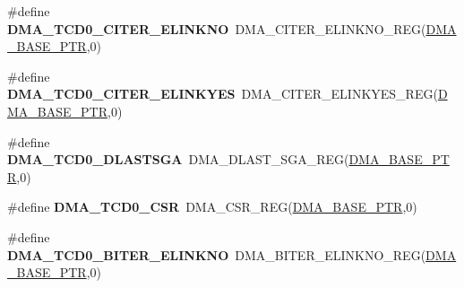 \begin{DoxyCompactItemize}
\item 
\hypertarget{group___d_m_a___register___accessor___macros_gaf189723f0b4d98fffdf6860fcb74177d}{}\#define {\bfseries D\+M\+A\+\_\+\+T\+C\+D0\+\_\+\+C\+I\+T\+E\+R\+\_\+\+E\+L\+I\+N\+K\+N\+O}~D\+M\+A\+\_\+\+C\+I\+T\+E\+R\+\_\+\+E\+L\+I\+N\+K\+N\+O\+\_\+\+R\+E\+G(\hyperlink{group___d_m_a___peripheral_ga6997fbc1b1973e9f27170217a3bd6f22}{D\+M\+A\+\_\+\+B\+A\+S\+E\+\_\+\+P\+T\+R},0)\label{group___d_m_a___register___accessor___macros_gaf189723f0b4d98fffdf6860fcb74177d}

\item 
\hypertarget{group___d_m_a___register___accessor___macros_ga9402d88f1a2681a38ed38bfdb2a94969}{}\#define {\bfseries D\+M\+A\+\_\+\+T\+C\+D0\+\_\+\+C\+I\+T\+E\+R\+\_\+\+E\+L\+I\+N\+K\+Y\+E\+S}~D\+M\+A\+\_\+\+C\+I\+T\+E\+R\+\_\+\+E\+L\+I\+N\+K\+Y\+E\+S\+\_\+\+R\+E\+G(\hyperlink{group___d_m_a___peripheral_ga6997fbc1b1973e9f27170217a3bd6f22}{D\+M\+A\+\_\+\+B\+A\+S\+E\+\_\+\+P\+T\+R},0)\label{group___d_m_a___register___accessor___macros_ga9402d88f1a2681a38ed38bfdb2a94969}

\item 
\hypertarget{group___d_m_a___register___accessor___macros_gaca4ffe01080735f9e83554fde2f73148}{}\#define {\bfseries D\+M\+A\+\_\+\+T\+C\+D0\+\_\+\+D\+L\+A\+S\+T\+S\+G\+A}~D\+M\+A\+\_\+\+D\+L\+A\+S\+T\+\_\+\+S\+G\+A\+\_\+\+R\+E\+G(\hyperlink{group___d_m_a___peripheral_ga6997fbc1b1973e9f27170217a3bd6f22}{D\+M\+A\+\_\+\+B\+A\+S\+E\+\_\+\+P\+T\+R},0)\label{group___d_m_a___register___accessor___macros_gaca4ffe01080735f9e83554fde2f73148}

\item 
\hypertarget{group___d_m_a___register___accessor___macros_gac6c6031712fe92a2e0866b5cdaedbc09}{}\#define {\bfseries D\+M\+A\+\_\+\+T\+C\+D0\+\_\+\+C\+S\+R}~D\+M\+A\+\_\+\+C\+S\+R\+\_\+\+R\+E\+G(\hyperlink{group___d_m_a___peripheral_ga6997fbc1b1973e9f27170217a3bd6f22}{D\+M\+A\+\_\+\+B\+A\+S\+E\+\_\+\+P\+T\+R},0)\label{group___d_m_a___register___accessor___macros_gac6c6031712fe92a2e0866b5cdaedbc09}

\item 
\hypertarget{group___d_m_a___register___accessor___macros_ga96730875a7b5ef4cc612fca19996a011}{}\#define {\bfseries D\+M\+A\+\_\+\+T\+C\+D0\+\_\+\+B\+I\+T\+E\+R\+\_\+\+E\+L\+I\+N\+K\+N\+O}~D\+M\+A\+\_\+\+B\+I\+T\+E\+R\+\_\+\+E\+L\+I\+N\+K\+N\+O\+\_\+\+R\+E\+G(\hyperlink{group___d_m_a___peripheral_ga6997fbc1b1973e9f27170217a3bd6f22}{D\+M\+A\+\_\+\+B\+A\+S\+E\+\_\+\+P\+T\+R},0)\label{group___d_m_a___register___accessor___macros_ga96730875a7b5ef4cc612fca19996a011}


\end{DoxyCompactItemize}
